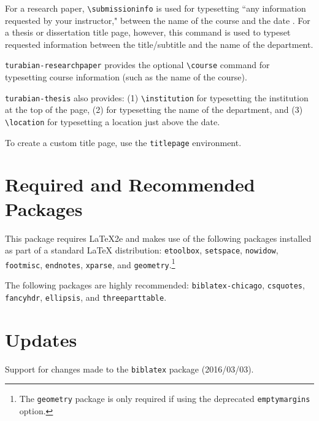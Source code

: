 \documentclass{article}
\begin{document}
For a research paper, \texttt{\textbackslash submissioninfo} is used for typesetting ``any information requested by your instructor," between the name of the course and the date \autocite[376]{turabian_manual_2013}. For a thesis or dissertation title page, however, this command is used to typeset requested information between the title/subtitle and the name of the department.

\texttt{turabian-researchpaper} provides the optional \texttt{\textbackslash course} command for typesetting course information (such as the name of the course).

\texttt{turabian-thesis} also provides: (1) \texttt{\textbackslash institution} for typesetting the institution at the top of the page, (2) for typesetting the name of the department, and (3) \texttt{\textbackslash location} for typesetting a location just above the date.

To create a custom title page, use the \texttt{titlepage} environment.


\section{Required and Recommended Packages}
\label{sec:required_packages}

This package requires \LaTeX{}2e and makes use of the following packages installed as part of a standard \LaTeX{} distribution: \texttt{etoolbox}, \texttt{setspace}, \texttt{nowidow}, \texttt{footmisc}, \texttt{endnotes}, \texttt{xparse}, and \texttt{geometry}.\footnote{%
	The \texttt{geometry} package is only required if using the deprecated \texttt{emptymargins} option.}

The following packages are highly recommended: \texttt{biblatex-chicago}, \texttt{csquotes}, \texttt{fancyhdr}, \texttt{ellipsis}, and \texttt{threeparttable}.


\section{Updates}
\label{sec:updates}

%

Support for changes made to the \texttt{biblatex} package (2016/03/03).
\end{document}
